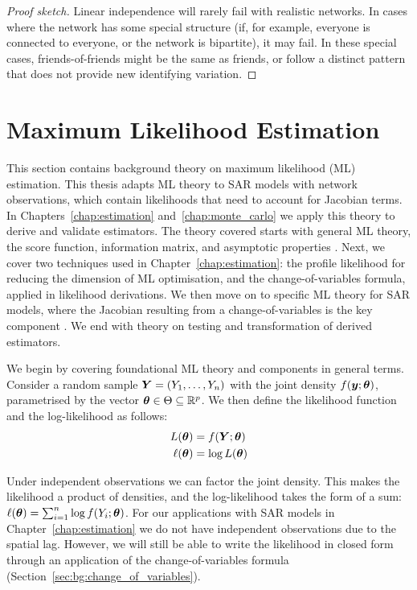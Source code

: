 \begin{proof}[Proof sketch]
Linear independence will rarely fail with realistic networks. In cases where the network has some special structure (if, for example, everyone is connected to everyone, or the network is bipartite), it may fail. In these special cases, friends-of-friends might be the same as friends, or follow a distinct pattern that does not provide new identifying variation.
\end{proof}

\section{Maximum Likelihood Estimation}
\label{sec:bg:mle}
This section contains background theory on maximum likelihood (ML) estimation. This thesis adapts ML theory to SAR models with network observations, which contain likelihoods that need to account for Jacobian terms. In Chapters~\ref{chap:estimation} and~\ref{chap:monte_carlo} we apply this theory to derive and validate estimators. The theory covered starts with general ML theory, the score function, information matrix, and asymptotic properties \parencite{Casella2002}. Next, we cover two techniques used in Chapter~\ref{chap:estimation}: the profile likelihood for reducing the dimension of ML optimisation, and the change-of-variables formula, applied in likelihood derivations. We then move on to specific ML theory for SAR models, where the Jacobian resulting from a change-of-variables is the key component \parencite{LeSage2009, Lee2004}. We end with theory on testing and transformation of derived estimators.

We begin by covering foundational ML theory and components in general terms. Consider a random sample $\bm{Y} = (Y_1, \ldots, Y_n)$ with the joint density $f(\bm{y}; \bm{\theta})$, parametrised by the vector $\bm{\theta} \in \Theta \subseteq \mathbb{R}^p$. We then define the likelihood function and the log-likelihood as follows:
\begin{align}
    L(\bm{\theta}) &= f(\bm{Y}; \bm{\theta}) \\
    \ell(\bm{\theta}) &= \log L(\bm{\theta})
\end{align}

Under independent observations we can factor the joint density. This makes the likelihood a product of densities, and the log-likelihood takes the form of a sum: $\ell(\bm{\theta}) = \sum_{i=1}^n \log f(Y_i; \bm{\theta})$. For our applications with SAR models in Chapter~\ref{chap:estimation} we do not have independent observations due to the spatial lag. However, we will still be able to write the likelihood in closed form through an application of the change-of-variables formula (Section~\ref{sec:bg:change_of_variables}).

